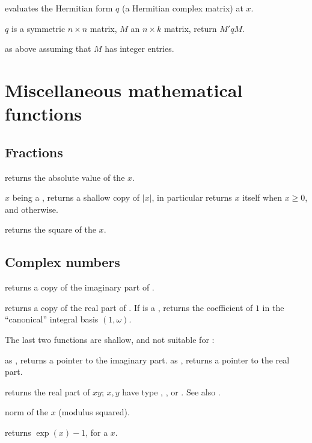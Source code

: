  evaluates the Hermitian form $q$
(a Hermitian complex matrix) at $x$.

 $q$ is a symmetric $n\times n$ matrix,
$M$ an $n\times k$ matrix, return $M' q M$.

 as above assuming that $M$ has integer
entries.

\newpage
\chapter{Miscellaneous mathematical functions}

\section{Fractions}

 returns the absolute value of the  $x$.

 $x$ being a , returns a shallow
copy of $|x|$, in particular returns $x$ itself when $x \geq 0$, and
 otherwise.

 returns the square of the  $x$.

\section{Complex numbers}

 returns a copy of the imaginary part of .

 returns a copy of the real part of . If 
is a , returns the coefficient of $1$ in the ``canonical'' integral
basis $(1,\omega)$.

The last two functions are shallow, and not suitable for :

 as , returns a pointer to the imaginary
part.
 as , returns a pointer to the real part.

 returns the real part of $xy$;
$x,y$ have type , ,  or . See also
.

 norm of the  $x$ (modulus squared).

 returns $\exp(x)-1$, for a  $x$.

